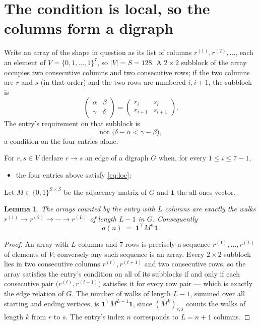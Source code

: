 \documentclass[11pt,a4paper]{article}
\theoremstyle{plain}
\newtheorem{lemma}[theorem]{Lemma}
\theoremstyle{definition}
\begin{document}
\section{The condition is local, so the columns form a digraph}

Write an array of the shape in question as its list of columns
$r^{(1)},r^{(2)},\dots$, each an element of
$V=\{0,1,\dots,1\}^{7}$, so $|V|=S=128$. A $2\times2$ subblock of the array
occupies two consecutive columns and two consecutive rows; if the two columns are $r$
and $s$ (in that order) and the two rows are numbered $i,i+1$,
the subblock is
\[
\begin{pmatrix}\alpha&\beta\\\gamma&\delta\end{pmatrix}=\begin{pmatrix}r_i&s_i\\r_{i+1}&s_{i+1}\end{pmatrix}.
\]
The entry's requirement on that subblock is
\begin{equation}\label{eq:loc}
\text{not }\bigl(\delta-\alpha<\gamma-\beta\bigr),
\end{equation}
a condition on the four entries alone.

For $r,s\in V$ declare $r\to s$ an edge of a digraph $G$ when, for every
$1\le i\le 7-1$,
\begin{itemize}
\item the four entries above satisfy \eqref{eq:loc};

\end{itemize}
Let $M\in\{0,1\}^{S\times S}$ be the adjacency matrix of $G$ and $\mathbf{1}$ the
all-ones vector.

\begin{lemma}\label{lem:walk}
The arrays counted by the entry with $L$ columns are exactly the walks
$r^{(1)}\to r^{(2)}\to\cdots\to r^{(L)}$ of length $L-1$ in $G$. Consequently
\[
a(n)\;=\;\mathbf{1}^{\!\top}M^{n}\mathbf{1} .
\]
\end{lemma}

\begin{proof}
An array with $L$ columns and $7$ rows is precisely a sequence
$r^{(1)},\dots,r^{(L)}$ of elements of $V$; conversely any such sequence is an array.
Every $2\times2$ subblock lies in two consecutive columns $r^{(t)},r^{(t+1)}$ and two
consecutive rows, so the array satisfies the entry's condition on all of its subblocks
if and only if each consecutive pair $\bigl(r^{(t)},r^{(t+1)}\bigr)$ satisfies it for
every row pair --- which is exactly the edge relation of $G$. The number of walks of
length $L-1$, summed over all starting and ending vertices, is
$\mathbf{1}^{\!\top}M^{L-1}\mathbf{1}$, since $(M^{k})_{r,s}$ counts the walks of
length $k$ from $r$ to $s$. The entry's index $n$ corresponds to $L=n+1$ columns.
\end{proof}
\end{document}
